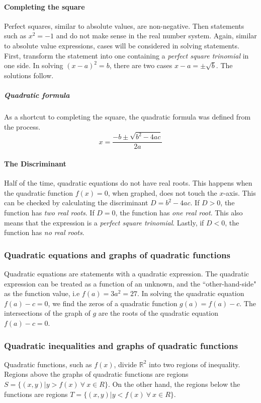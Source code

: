 \paragraph{Completing the square}
Perfect squares, similar to absolute values, are non-negative.
Then statements such as $x^2 = -1$ and do not make sense in the real number system.
Again, similar to absolute value expressions, cases will be considered in solving statements.
First, transform the statement into one containing a \emph{perfect square trinomial} in one side.
In solving $(x-a)^2 = b$, there are two cases $x-a = \pm \sqrt{b}$.
The solutions follow.

\subparagraph{Quadratic formula}
As a shortcut to completing the square, the quadratic formula was defined from the process.
\[
x = \dfrac{-b \pm \sqrt{b^2-4ac}}{2a}
\]

\paragraph{The Discriminant}
Half of the time, quadratic equations do not have real roots.
This happens when the quadratic function $f(x) = 0$, when graphed, does not touch the $x$-axis.
This can be checked by calculating the discriminant $D = b^2-4ac$.
If $D > 0$, the function has \emph{two real roots}.
If $D = 0$, the function has \emph{one real root}.
This also means that the expression is a \emph{perfect square trinomial}.
Lastly, if $D < 0$, the function has \emph{no real roots}.

\subsubsection{Quadratic equations and graphs of quadratic functions}
Quadratic equations are statements with a quadratic expression.
The quadratic expression can be treated as a function of an unknown, and the ``other-hand-side" as the function value, i.e $f(a) = 3a^2 = 27$.
In solving the quadratic equation $f(a)-c = 0$, we find the zeros of a quadratic function $g(a) = f(a)-c$.
The intersections of the graph of $g$ are the roots of the quadratic equation $f(a)-c = 0$.

\subsubsection{Quadratic inequalities and graphs of quadratic functions}
Quadratic functions, such as $f(x)$, divide $\mathbb{R}^2$ into two regions of inequality.
Regions above the graphs of quadratic functions are regions $S = \{(x, y) | y > f(x)\ \forall\ x \in R\}$.
On the other hand, the regions below the functions are regions $T = \{(x, y) | y < f(x)\ \forall\ x \in R\}$.

